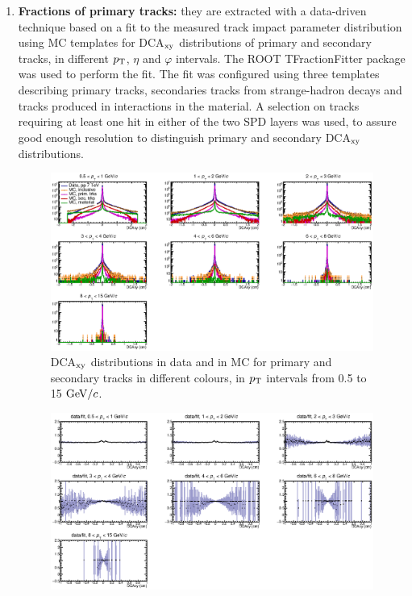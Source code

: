 \begin{enumerate}
\item {\bf Fractions of primary tracks:} they are extracted with a data-driven technique based on a fit to
 the measured track impact parameter distribution using MC templates for 
 DCA$_{\rm xy}$ distributions of primary and secondary tracks, in different
 $p_{\rm T}$, $\eta$ and $\varphi$ intervals. The ROOT TFractionFitter 
 package was used to perform the fit. The fit was configured 
 using three templates describing primary tracks, secondaries tracks
 from strange-hadron decays and tracks produced in interactions in the material. 
 A selection on tracks requiring at least one hit in either of the two SPD layers 
 was used, to assure good enough resolution to distinguish primary and 
 secondary DCA$_{\rm xy}$ distributions.
\begin{figure}[!htb]
\begin{center}
\includegraphics[width=.99\textwidth]{FigCap4/FitComponents.eps}
\caption{DCA$_{\rm xy}$ distributions in data and in MC for primary and secondary tracks in different colours, in $p_{\rm T}$ intervals from 0.5 to 15 $\mathrm{GeV}/c$.}
\label{fig:DCAxyDataMCVsPt}
\end{center}
\end{figure}
\begin{figure}[!hb]
\begin{center}
\includegraphics[width=.99\textwidth]{FigCap4/DataOverFit.eps}

\end{center}
\end{figure}
\end{enumerate}

